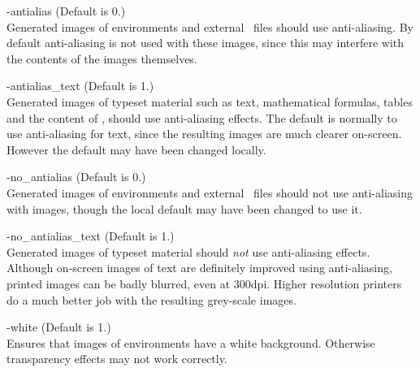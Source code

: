\begin{htmllist}
%
\item [ -antialias\label{cs_aalias}]
 (Default is 0.)\\
Generated images of  environments and external \PS\ files
should use anti-aliasing. By default anti-aliasing is not
used with these images, since this may interfere with the contents
of the images themselves.

%
\item [ -antialias\_text\label{cs_aaliastext}]
 (Default is 1.)\\
Generated images of typeset material such as text, mathematical formulas,
tables and the content of  ,
should use anti-aliasing effects.\html{\\}
The default is normally to use anti-aliasing for text, 
since the resulting images are much clearer on-screen. 
However the default may have been changed locally.


%
\item [ -no\_antialias\label{cs_noaalias}]
 (Default is 0.)\\
Generated images of  environments and external \PS\ files 
should not use anti-aliasing with images, 
though the local default may have been changed to use it.


%
\item [ -no\_antialias\_text\label{cs_noaaliastext}]
 (Default is 1.)\\
Generated images of typeset material should \emph{not} use anti-aliasing effects.
Although on-screen images of text are definitely improved using anti-aliasing,
printed images can be badly blurred, even at 300dpi. 
Higher resolution printers do a much better job with the resulting grey-scale images.

%
\item [ -white\label{cs_white}]
 (Default is 1.)\\
Ensures that images of  environments have a white
background. Otherwise transparency effects may not work correctly.


\end{htmllist}
